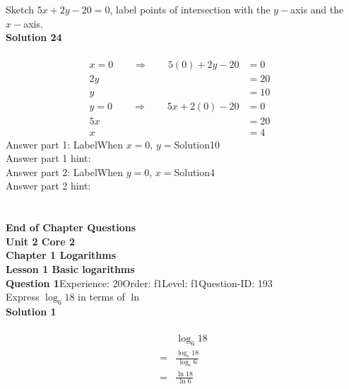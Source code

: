 \documentclass{article}
\begin{document}
Sketch $5x+2y-20=0$, label points of intersection with the $y-$axis and the $x-$axis.\\[4pt]
\noindent\textbf{Solution 24}\\[2pt]
\\[-35pt]\begin{align*}
x=0\qquad\Rightarrow\qquad 5(0)+2y-20&=0&\\[2pt]
2y&=20\\[2pt]
y&=10\\[12pt]
y=0\qquad\Rightarrow\qquad 5x+2(0)-20&=0&\\[2pt]
5x&=20\\[2pt]
x&=4
\end{align*}
Answer part 1: \hspace{10pt}Label\hspace{10pt}When $x=0$, $y=$\hspace{10pt}Solution\hspace{10pt}10\\
Answer part 1 hint: \hspace{15pt}\\
Answer part 2: \hspace{10pt}Label\hspace{10pt}When $y=0$, $x=$\hspace{10pt}Solution\hspace{10pt}4\\
Answer part 2 hint: \hspace{15pt}\\
\\[4pt]
\\[2pt]
\noindent\large{\textbf{End of Chapter Questions}}\\[15pt]
\noindent\huge{\textbf{Unit 2 Core 2}}\\[18pt]
\noindent\huge{\textbf{Chapter 1 Logarithms}}\\[15pt]
\noindent\huge{\textbf{Lesson 1 Basic logarithms}}\\[12pt]
\noindent\textbf{Question 1}\hspace{20pt}Experience: 20\hspace{20pt}Order: f1\hspace{20pt}Level: f1\hspace{20pt}Question-ID: 193\\[2pt]
Express $\log_{6}18$ in terms of $\ln$\\[4pt]
\noindent\textbf{Solution 1}\\[2pt]
\\[-35pt]\begin{align*}
&\log_{6}18\\[2pt]
=&\displaystyle\frac{\log_{e}18}{\log_{e}6}\\[2pt]
=&\displaystyle\frac{\ln18}{\ln6}\\[-100pt]
\end{align*}
\end{document}
